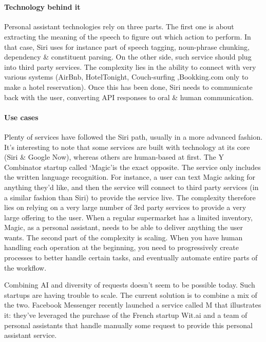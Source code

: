 \documentclass[12pt]{article}
\begin{document}
\\

\paragraph{Technology behind it}
Personal assistant technologies rely on three parts.
The first one is about extracting the meaning of the speech to figure out which
action to perform. In that case, Siri uses for instance part of speech tagging,
noun-phrase chunking, dependency \& constituent parsing. On the other side,
such service should plug into third party services. The complexity lies in the
ability to connect with very various systems (AirBnb, HotelTonight, Couch-surfing
,Bookking.com only to make a hotel reservation). Once this has been done, Siri
needs to communicate back with the user, converting API responses to oral \&
human communication.

\paragraph{Use cases}

Plenty of services have followed the Siri path, usually in a more advanced
fashion. It's interesting to note that some services are built with technology
at its core (Siri \& Google Now), whereas others are human-based at first. The Y
Combinator startup called \lq Magic\rq  is the exact opposite. The service only
includes the written language recognition. For instance, a user can text Magic
asking for anything they'd like, and then the service will connect to third
party services (in a similar fashion than Siri) to provide the service live. The
complexity therefore lies on relying on a very large number of 3rd party
services to provide a very large offering to the user. When a regular supermarket
has a limited inventory, Magic, as a personal assistant, needs to be able to
deliver anything the user wants. The second part of the complexity is scaling.
When you have human handling each operation at the beginning, you need to
progressively create processes to better handle certain tasks, and eventually
automate entire parts of the workflow.

Combining AI and diversity of requests doesn't seem to be possible today. Such
startups are having trouble to scale. The current solution is to combine a mix
of the two. Facebook Messenger recently launched a service called M that
illustrates it: they've leveraged the purchase of the French startup Wit.ai and
a team of personal assistants that handle manually some request to provide this
personal assistant service.
\end{document}
